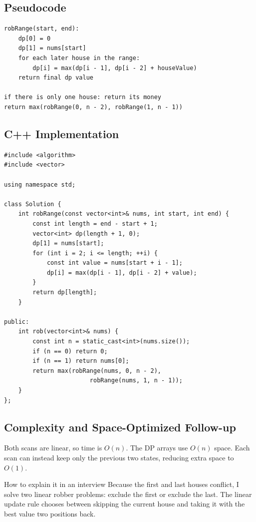 \subsection{Pseudocode}
\begin{lstlisting}[style=pseudocode]
robRange(start, end):
    dp[0] = 0
    dp[1] = nums[start]
    for each later house in the range:
        dp[i] = max(dp[i - 1], dp[i - 2] + houseValue)
    return final dp value

if there is only one house: return its money
return max(robRange(0, n - 2), robRange(1, n - 1))
\end{lstlisting}

\subsection{C++ Implementation}
\begin{lstlisting}[style=compactcode,caption={Complete C++ solution: House Robber II}]
#include <algorithm>
#include <vector>

using namespace std;

class Solution {
    int robRange(const vector<int>& nums, int start, int end) {
        const int length = end - start + 1;
        vector<int> dp(length + 1, 0);
        dp[1] = nums[start];
        for (int i = 2; i <= length; ++i) {
            const int value = nums[start + i - 1];
            dp[i] = max(dp[i - 1], dp[i - 2] + value);
        }
        return dp[length];
    }

public:
    int rob(vector<int>& nums) {
        const int n = static_cast<int>(nums.size());
        if (n == 0) return 0;
        if (n == 1) return nums[0];
        return max(robRange(nums, 0, n - 2),
                        robRange(nums, 1, n - 1));
    }
};
\end{lstlisting}

\subsection{Complexity and Space-Optimized Follow-up}
Both scans are linear, so time is \(O(n)\). The DP arrays use
\(O(n)\) space. Each scan can instead keep only the previous two states,
reducing extra space to \(O(1)\).

\begin{revisionbox}{How to explain it in an interview}
Because the first and last houses conflict, I solve two linear robber problems:
exclude the first or exclude the last. The linear update rule chooses between
skipping the current house and taking it with the best value two positions
back.
\end{revisionbox}

